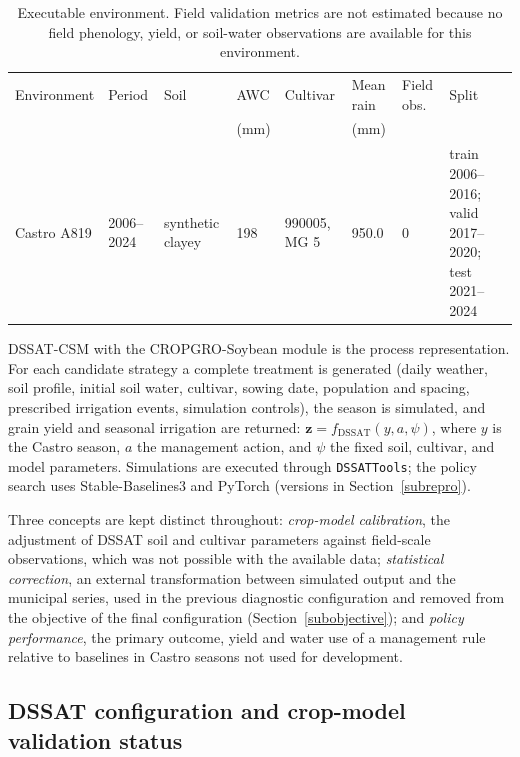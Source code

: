 \documentclass[times,final,authoryear]{elsarticle}
\begin{document}
\begin{table}[!h]
\centering
\scriptsize
\caption{Executable environment. Field validation metrics are not estimated because no field phenology, yield, or soil-water observations are available for this environment.}
\label{tab_environment_a_current}
\begin{tabular}{p{2.0cm}p{1.3cm}p{1.8cm}p{1.4cm}p{1.3cm}p{1.6cm}p{1.4cm}p{1.7cm}}
\hline
Environment & Period & Soil & AWC & Cultivar & Mean rain & Field obs. & Split \\
            &        &      & (mm) &          & (mm)      &            & \\
\hline
Castro A819 & 2006--2024 & synthetic clayey & 198 & 990005, MG 5 & 950.0 & 0 & train 2006--2016; valid 2017--2020; test 2021--2024 \\
\hline
\end{tabular}
\end{table}

DSSAT-CSM with the CROPGRO-Soybean module is the process representation. For each candidate strategy a complete treatment is generated (daily weather, soil profile, initial soil water, cultivar, sowing date, population and spacing, prescribed irrigation events, simulation controls), the season is simulated, and grain yield and seasonal irrigation are returned: $\mathbf{z} = f_{\text{DSSAT}}(y,a,\psi)$, where $y$ is the Castro season, $a$ the management action, and $\psi$ the fixed soil, cultivar, and model parameters. Simulations are executed through \texttt{DSSATTools}; the policy search uses Stable-Baselines3 and PyTorch (versions in Section~\ref{subrepro}).

Three concepts are kept distinct throughout: \emph{crop-model calibration}, the adjustment of DSSAT soil and cultivar parameters against field-scale observations, which was not possible with the available data; \emph{statistical correction}, an external transformation between simulated output and the municipal series, used in the previous diagnostic configuration and removed from the objective of the final configuration (Section~\ref{subobjective}); and \emph{policy performance}, the primary outcome, yield and water use of a management rule relative to baselines in Castro seasons not used for development.

\subsection{DSSAT configuration and crop-model validation status}
\label{subcropmodel}
\end{document}
